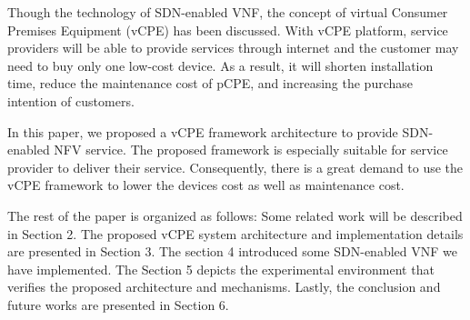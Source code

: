 Though the technology of SDN-enabled VNF, the concept of virtual Consumer Premises Equipment (vCPE) has been discussed. With vCPE platform, service providers will be able to provide services through internet and the customer may need to buy only one low-cost device. As a result, it will shorten installation time, reduce the maintenance cost of pCPE, and increasing the purchase intention of customers.

In this paper, we proposed a vCPE framework architecture to provide SDN-enabled NFV service. The proposed framework is especially suitable for service provider to deliver their service. Consequently, there is a great demand to use the vCPE framework to lower the devices cost as well as maintenance cost.

The rest of the paper is organized as follows: Some related work will be
described in Section 2. The proposed vCPE system architecture and
implementation details are presented in Section 3. The section 4 introduced some SDN-enabled VNF we have implemented. The Section 5 depicts the experimental environment that verifies the proposed architecture
and mechanisms. Lastly, the conclusion and future works are presented
in Section 6.
